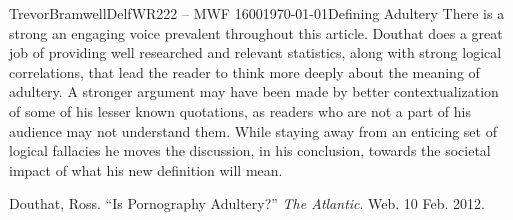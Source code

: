\documentclass[12pt,letterpaper]{article}
\begin{document}
\begin{mla}{Trevor}{Bramwell}{Delf}{WR222 -- MWF 1600}{\today}{Defining Adultery}
There is a strong an engaging voice prevalent throughout this article. Douthat does a great
job of providing well researched and relevant statistics, along with strong logical 
correlations, that lead the reader to think more deeply about the meaning of adultery. 
A stronger argument may have been made by better contextualization of some of his lesser
known quotations, as readers who are not a part of his audience may not understand them.
While staying away from an enticing set of logical fallacies he moves the discussion,
in his conclusion, towards the societal impact of what his new definition will mean.

\begin{workscitedinline}
\bibent
Douthat, Ross. ``Is Pornography Adultery?'' \emph{The Atlantic}. Web. 10 Feb. 2012. 
\end{workscitedinline}
\end{mla}
\end{document}

